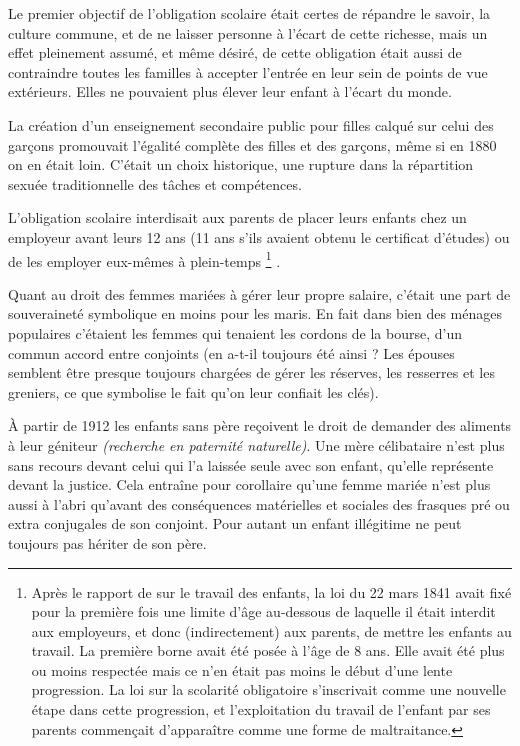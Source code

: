  Le premier objectif de l'obligation scolaire était certes de répandre le savoir, la culture commune, et de ne laisser personne à l'écart de cette richesse, mais un effet pleinement assumé, et même désiré, de cette obligation était aussi de contraindre toutes les familles à accepter l'entrée en leur sein de points de vue extérieurs. Elles ne pouvaient plus élever leur enfant à l'écart du monde. 

 La création d'un enseignement secondaire public pour filles calqué sur celui des garçons promouvait l'égalité complète des filles et des garçons, même si en 1880 on en était loin. C'était un choix historique, une rupture dans la répartition sexuée traditionnelle des tâches et compétences. 

 L'obligation scolaire interdisait aux parents de placer leurs enfants chez un employeur avant leurs 12 ans (11 ans s'ils avaient obtenu le certificat d'études) ou de les employer eux-mêmes à plein-temps%
\footnote{Après le rapport de  sur le travail des enfants, la loi du 22 mars 1841 avait fixé pour la première fois une limite d'âge au-dessous de laquelle il était interdit aux employeurs, et donc (indirectement) aux parents, de mettre les enfants au travail. La première borne avait été posée à l'âge de 8 ans. Elle avait été plus ou moins respectée mais ce n'en était pas moins le début d'une lente progression. La loi sur la scolarité obligatoire s'inscrivait comme une nouvelle étape dans cette progression, et l'exploitation du travail de l'enfant par ses parents commençait d'apparaître comme une forme de maltraitance.}%
. 

 Quant au droit des femmes mariées à gérer leur propre salaire, c'était une part de souveraineté symbolique en moins pour les maris. En fait dans bien des ménages populaires c'étaient les femmes qui tenaient les cordons de la bourse, d'un commun accord entre conjoints (en a-t-il toujours été ainsi ? Les épouses semblent être presque toujours chargées de gérer les réserves, les resserres et les greniers, ce que symbolise le fait qu'on leur confiait les clés).

 À partir de 1912 les enfants sans père reçoivent le droit de demander des aliments à leur géniteur \emph{(recherche en paternité naturelle)}. Une mère célibataire n'est plus sans recours devant celui qui l'a laissée seule avec son enfant, qu'elle représente devant la justice. Cela entraîne pour corollaire qu'une femme mariée n'est plus aussi à l'abri qu'avant des conséquences matérielles et sociales des frasques pré ou extra conjugales de son conjoint. Pour autant un enfant illégitime ne peut toujours pas hériter de son père. 


